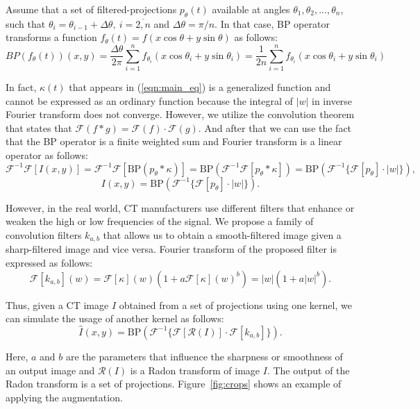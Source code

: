 Assume that a set of filtered-projections $p_{\theta}(t)$ available at angles $\theta_1, \theta_2, ..., \theta_n$, such that $\theta_i = \theta_{i - 1} + \Delta\theta,~i=\overline{2,n}$ and $\Delta\theta = \pi / n$. In that case, BP operator transforms a function $f_\theta(t) = f(x\cos\theta + y\sin\theta)$ as follows:
\[
BP(f_\theta(t))(x, y) = \frac{\Delta\theta}{2\pi}\sum\limits_{i=1}^n f_{\theta_i}(x\cos\theta_i + y\sin\theta_i) = \frac{1}{2n}\sum\limits_{i=1}^n f_{\theta_i}(x\cos\theta_i + y\sin\theta_i)
\]

In fact, $\kappa(t)$ that appears in (\ref{eqn:main_eq}) is a generalized function and cannot be expressed as an ordinary function because the integral of $|w|$ in inverse Fourier transform does not converge. However, we utilize the convolution theorem that states that $\mathcal{F}(f*g) = \mathcal{F}(f)\cdot\mathcal{F}(g)$. And after that we can use the fact that the BP operator is a finite weighted sum and Fourier transform is a linear operator as follows:
\[
\mathcal{F}^{-1}\mathcal{F}[I(x, y)] = \mathcal{F}^{-1}\mathcal{F}[\text{BP}(p_\theta * \kappa)] = \text{BP}(\mathcal{F}^{-1}\mathcal{F}[p_\theta * \kappa]) = \text{BP}(\mathcal{F}^{-1}\{\mathcal{F}[p_\theta]\cdot|w|\}),\]
\[I(x, y) = \text{BP}\left(\mathcal{F}^{-1}\{\mathcal{F}[p_\theta]\cdot|w|\}\right).\]

However, in the real world, CT manufacturers use different filters that enhance or weaken the high or low frequencies of the signal. We propose a family of convolution filters $k_{a,b}$ that allows us to obtain a smooth-filtered image given a sharp-filtered image and vice versa. Fourier transform of the proposed filter is expressed as follows:
\[\mathcal{F}[k_{a,b}](w) = \mathcal{F}[\kappa](w)(1 + a \mathcal{F}[\kappa](w)^b) = |w|(1 + a|w|^b).\]

Thus, given a CT image $I$ obtained from a set of projections using one kernel, we can simulate the usage of another kernel as follows:
\[\hat{I}(x, y) = \text{BP}\left(\mathcal{F}^{-1}\{\mathcal{F}[\mathcal{R}(I)]\cdot\mathcal{F}[k_{a,b}]\}\right).\]

Here, $a$ and $b$ are the parameters that influence the sharpness or smoothness of an output image and $\mathcal{R}(I)$ is a Radon transform of image $I$. The output of the Radon transform is a set of projections. Figure~\ref{fig:crops} shows an example of applying the augmentation.

